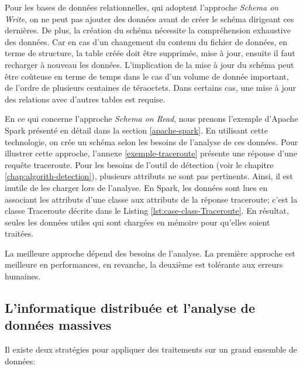 Pour les bases de données relationnelles, qui adoptent l'approche \textit{Schema on Write}, on ne peut pas ajouter des données avant de créer le schéma dirigeant ces dernières. De plus, la création du schéma nécessite la compréhension  exhaustive des données. 
Car en cas d'un changement du contenu du fichier de données, en terme de structure, la table créée doit être supprimée, mise à jour, ensuite il faut recharger à nouveau les données. L'implication de la mise à jour du schéma peut être coûteuse en terme de temps  dans le cas  d'un  volume de donnée  important, de l'ordre de plusieurs centaines de téraoctets. Dans certains cas, une mise à jour des relations avec d'autres tables est requise.

En ce qui concerne l'approche \textit{Schema on Read}, nous prenons l'exemple d'Apache Spark présenté en détail dans la section \ref{apache-spark}. En utilisant cette technologie, on crée un schéma selon les besoins de l'analyse de ces données.
Pour illustrer cette approche, l'annexe \ref{exemple-traceroute} présente une réponse d'une requête traceroute. Pour les besoins de l'outil de détection (voir le chapitre \ref{chap:algorith-detection}), plusieurs attributs ne sont pas pertinents. Ainsi, il est inutile de les charger lors de l'analyse.   En Spark, les données sont lues en associant les attributs d'une classe aux attributs de la réponse traceroute; c'est la classe Traceroute décrite dans le Listing \ref{lst:case-class-Traceroute}. En résultat, seules les données utiles qui sont chargées en mémoire pour qu'elles soient traitées.

La meilleure approche dépend des besoins de l'analyse. La première approche est meilleure en performances, en revanche, la deuxième est tolérante aux erreurs  humaines.

		\subsection{L'informatique distribuée et l'analyse de données massives} \label{sec:distruted-camput}
		Il existe deux stratégies pour appliquer des traitements sur un grand ensemble de données: 
		
